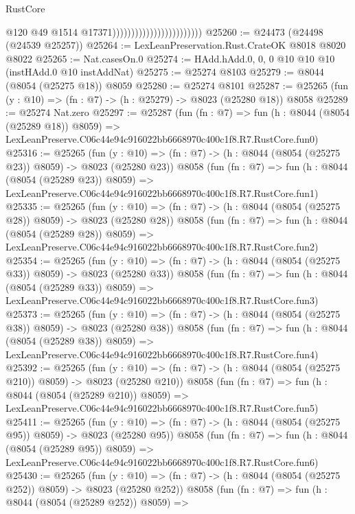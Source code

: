 \begin{lexlean}{RustCore}
\begin{coremodule}
                                                    @120
                                                    @49
                                                    @1514
                                                    @17371))))))))))))))))))))))))
@25260 := @24473 (@24498 (@24539 @25257))
@25264 := LexLeanPreservation.Rust.CrateOK @8018 @8020 @8022
@25265 := Nat.casesOn.{0}
@25274 := HAdd.hAdd.{0, 0, 0} @10 @10 @10 (instHAdd.{0} @10 instAddNat)
@25275 := @25274 @8103
@25279 := @8044 (@8054 (@25275 @18)) @8059
@25280 := @25274 @8101
@25287 := @25265 (fun (y : @10) => (fn : @7) -> (h : @25279) -> @8023 (@25280 @18)) @8058
@25289 := @25274 Nat.zero
@25297 := @25287
    (fun (fn : @7) =>
    fun (h : @8044 (@8054 (@25289 @18)) @8059) =>
    LexLeanPreserve.C06c44e94c916022bb6668970c400c1f8.R7.RustCore.fun0)
@25316 := @25265
    (fun (y : @10) => (fn : @7) -> (h : @8044 (@8054 (@25275 @23)) @8059) -> @8023 (@25280 @23))
    @8058
    (fun (fn : @7) =>
    fun (h : @8044 (@8054 (@25289 @23)) @8059) =>
    LexLeanPreserve.C06c44e94c916022bb6668970c400c1f8.R7.RustCore.fun1)
@25335 := @25265
    (fun (y : @10) => (fn : @7) -> (h : @8044 (@8054 (@25275 @28)) @8059) -> @8023 (@25280 @28))
    @8058
    (fun (fn : @7) =>
    fun (h : @8044 (@8054 (@25289 @28)) @8059) =>
    LexLeanPreserve.C06c44e94c916022bb6668970c400c1f8.R7.RustCore.fun2)
@25354 := @25265
    (fun (y : @10) => (fn : @7) -> (h : @8044 (@8054 (@25275 @33)) @8059) -> @8023 (@25280 @33))
    @8058
    (fun (fn : @7) =>
    fun (h : @8044 (@8054 (@25289 @33)) @8059) =>
    LexLeanPreserve.C06c44e94c916022bb6668970c400c1f8.R7.RustCore.fun3)
@25373 := @25265
    (fun (y : @10) => (fn : @7) -> (h : @8044 (@8054 (@25275 @38)) @8059) -> @8023 (@25280 @38))
    @8058
    (fun (fn : @7) =>
    fun (h : @8044 (@8054 (@25289 @38)) @8059) =>
    LexLeanPreserve.C06c44e94c916022bb6668970c400c1f8.R7.RustCore.fun4)
@25392 := @25265
    (fun (y : @10) => (fn : @7) -> (h : @8044 (@8054 (@25275 @210)) @8059) -> @8023 (@25280 @210))
    @8058
    (fun (fn : @7) =>
    fun (h : @8044 (@8054 (@25289 @210)) @8059) =>
    LexLeanPreserve.C06c44e94c916022bb6668970c400c1f8.R7.RustCore.fun5)
@25411 := @25265
    (fun (y : @10) => (fn : @7) -> (h : @8044 (@8054 (@25275 @95)) @8059) -> @8023 (@25280 @95))
    @8058
    (fun (fn : @7) =>
    fun (h : @8044 (@8054 (@25289 @95)) @8059) =>
    LexLeanPreserve.C06c44e94c916022bb6668970c400c1f8.R7.RustCore.fun6)
@25430 := @25265
    (fun (y : @10) => (fn : @7) -> (h : @8044 (@8054 (@25275 @252)) @8059) -> @8023 (@25280 @252))
    @8058
    (fun (fn : @7) =>
    fun (h : @8044 (@8054 (@25289 @252)) @8059) =>

\end{coremodule}
\end{lexlean}
